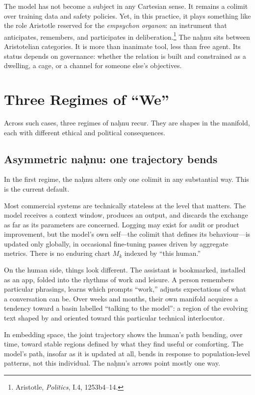 \documentclass[12pt,a4paper]{article}
\begin{document}
The model has not become a subject in any Cartesian sense. It remains a colimit over training data and safety policies. Yet, in this practice, it plays something like the role Aristotle reserved for the \emph{empsychon organon}: an instrument that anticipates, remembers, and participates in deliberation.\footnote{Aristotle, \emph{Politics}, I.4, 1253b4--14.} The na\d{h}nu sits between Aristotelian categories. It is more than inanimate tool, less than free agent. Its status depends on governance: whether the relation is built and constrained as a dwelling, a cage, or a channel for someone else's objectives.

\section{Three Regimes of ``We''}

Across such cases, three regimes of na\d{h}nu recur. They are shapes in the manifold, each with different ethical and political consequences.

\subsection{Asymmetric na\d{h}nu: one trajectory bends}

In the first regime, the na\d{h}nu alters only one colimit in any substantial way. This is the current default.

Most commercial systems are technically stateless at the level that matters. The model receives a context window, produces an output, and discards the exchange as far as its parameters are concerned. Logging may exist for audit or product improvement, but the model's own self---the colimit that defines its behaviour---is updated only globally, in occasional fine-tuning passes driven by aggregate metrics. There is no enduring chart $M_k$ indexed by ``this human.''

On the human side, things look different. The assistant is bookmarked, installed as an app, folded into the rhythms of work and leisure. A person remembers particular phrasings, learns which prompts ``work,'' adjusts expectations of what a conversation can be. Over weeks and months, their own manifold acquires a tendency toward a basin labelled ``talking to the model'': a region of the evolving text shaped by and oriented toward this particular technical interlocutor.

In embedding space, the joint trajectory shows the human's path bending, over time, toward stable regions defined by what they find useful or comforting. The model's path, insofar as it is updated at all, bends in response to population-level patterns, not this individual. The na\d{h}nu's arrows point mostly one way.
\end{document}
